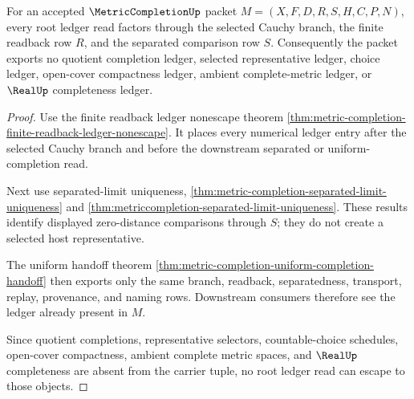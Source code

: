 \begin{theorem}
\label{thm:metriccompletion-root-obligation-ledger}
For an accepted $\MetricCompletionUp$ packet $M=(X,F,D,R,S,H,C,P,N)$, every root ledger read factors through the selected Cauchy branch, the finite readback row $R$, and the separated comparison row $S$. Consequently the packet exports no quotient completion ledger, selected representative ledger, choice ledger, open-cover compactness ledger, ambient complete-metric ledger, or $\RealUp$ completeness ledger.
\end{theorem}
\begin{proof}
Use the finite readback ledger nonescape theorem \autoref{thm:metric-completion-finite-readback-ledger-nonescape}. It places every numerical ledger entry after the selected Cauchy branch and before the downstream separated or uniform-completion read.

Next use separated-limit uniqueness, \autoref{thm:metric-completion-separated-limit-uniqueness} and \autoref{thm:metriccompletion-separated-limit-uniqueness}. These results identify displayed zero-distance comparisons through $S$; they do not create a selected host representative.

The uniform handoff theorem \autoref{thm:metric-completion-uniform-completion-handoff} then exports only the same branch, readback, separatedness, transport, replay, provenance, and naming rows. Downstream consumers therefore see the ledger already present in $M$.

Since quotient completions, representative selectors, countable-choice schedules, open-cover compactness, ambient complete metric spaces, and $\RealUp$ completeness are absent from the carrier tuple, no root ledger read can escape to those objects.
\end{proof}

